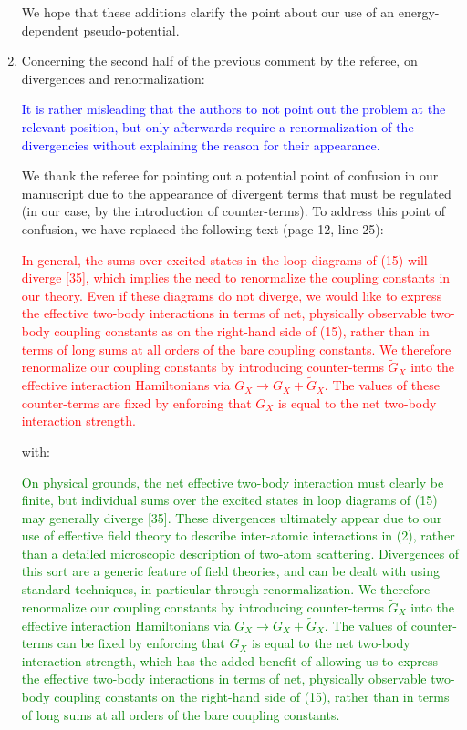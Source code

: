 \documentclass[preprint]{revtex4-1}
\newcommand{\1}{\mathds{1}}
\newcommand{\blue}[1]{\textcolor{blue}{#1}}
\newcommand{\red}[1]{\textcolor{red}{#1}}
\newcommand{\green}[1]{\textcolor{green}{#1}}
\begin{document}
\begin{enumerate}
  We hope that these additions clarify the point about our use of an
  energy-dependent pseudo-potential.


\item Concerning the second half of the previous comment by the
  referee, on divergences and renormalization:

  \blue{It is rather misleading that the authors to not point out the
    problem at the relevant position, but only afterwards require a
    renormalization of the divergencies without explaining the reason
    for their appearance.}

  We thank the referee for pointing out a potential point of confusion
  in our manuscript due to the appearance of divergent terms that must
  be regulated (in our case, by the introduction of counter-terms).
  To address this point of confusion, we have replaced the following
  text (page 12, line 25):

  \red{In general, the sums over excited states in the loop diagrams
    of (15) will diverge [35], which implies the need to renormalize
    the coupling constants in our theory.  Even if these diagrams do
    not diverge, we would like to express the effective two-body
    interactions in terms of net, physically observable two-body
    coupling constants as on the right-hand side of (15), rather than
    in terms of long sums at all orders of the bare coupling
    constants.  We therefore renormalize our coupling constants by
    introducing counter-terms $\tilde G_X$ into the effective
    interaction Hamiltonians via $G_X\to G_X+\tilde G_X$.  The values
    of these counter-terms are fixed by enforcing that $G_X$ is equal
    to the net two-body interaction strength.}

  with:

  \green{On physical grounds, the net effective two-body interaction
    must clearly be finite, but individual sums over the excited
    states in loop diagrams of (15) may generally diverge [35].  These
    divergences ultimately appear due to our use of effective field
    theory to describe inter-atomic interactions in (2), rather than a
    detailed microscopic description of two-atom scattering.
    Divergences of this sort are a generic feature of field theories,
    and can be dealt with using standard techniques, in particular
    through renormalization.  We therefore renormalize our coupling
    constants by introducing counter-terms $\tilde G_X$ into the
    effective interaction Hamiltonians via $G_X\to G_X+\tilde G_X$.
    The values of counter-terms can be fixed by enforcing that $G_X$
    is equal to the net two-body interaction strength, which has the
    added benefit of allowing us to express the effective two-body
    interactions in terms of net, physically observable two-body
    coupling constants on the right-hand side of (15), rather than in
    terms of long sums at all orders of the bare coupling constants.}


\end{enumerate}
\end{document}
